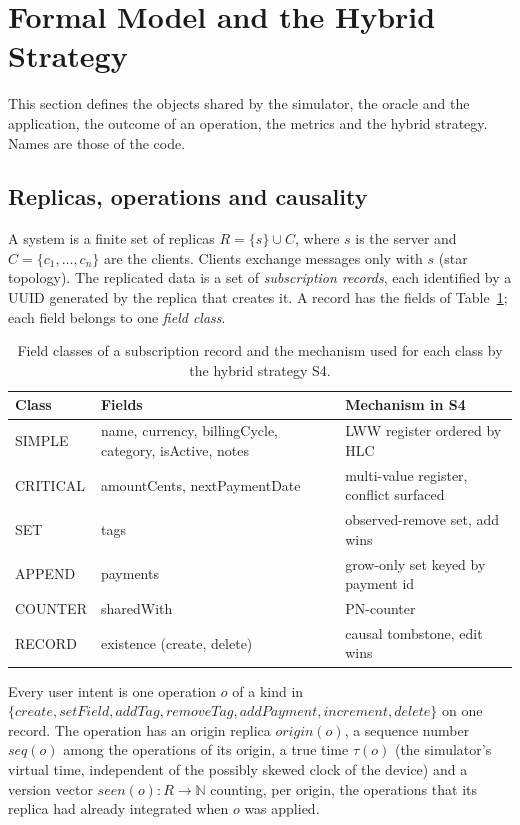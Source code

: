 \section{Formal Model and the Hybrid Strategy}\label{sec:model}

This section defines the objects shared by the simulator, the oracle and the application, the outcome of an
operation, the metrics and the hybrid strategy. Names are those of the code.

\subsection{Replicas, operations and causality}

\begin{definition}[System]\label{def:system}
A system is a finite set of replicas $R = \{s\} \cup C$, where $s$ is the server and $C = \{c_1, \dots, c_n\}$ are
the clients. Clients exchange messages only with $s$ (star topology). The replicated data is a set of
\emph{subscription records}, each identified by a UUID generated by the replica that creates it. A record has the
fields of Table~\ref{tab:classes}; each field belongs to one \emph{field class}.
\end{definition}

\begin{table}[ht]
\caption{Field classes of a subscription record and the mechanism used for each class by the hybrid strategy S4.}
\label{tab:classes}
\footnotesize
\begin{tabular}{@{}l>{\raggedright\arraybackslash}p{}>{\raggedright\arraybackslash}p{}@{}}
\toprule
Class & Fields & Mechanism in S4 \\
\midrule
SIMPLE & name, currency, billingCycle, category, isActive, notes & LWW register ordered by HLC \\
CRITICAL & amountCents, nextPaymentDate & multi-value register, conflict surfaced \\
SET & tags & observed-remove set, add wins \\
APPEND & payments & grow-only set keyed by payment id \\
COUNTER & sharedWith & PN-counter \\
RECORD & existence (create, delete) & causal tombstone, edit wins \\
\bottomrule
\end{tabular}
\end{table}

\begin{definition}[Operation]\label{def:op}
Every user intent is one operation $o$ of a kind in $\{\mathit{create}, \mathit{setField}, \mathit{addTag},
\mathit{removeTag}, \mathit{addPayment}, \mathit{increment}, \mathit{delete}\}$ on one record. The operation has an
origin replica $\mathit{origin}(o)$, a sequence number $\mathit{seq}(o)$ among the operations of its origin, a true
time $\tau(o)$ (the simulator's virtual time, independent of the possibly skewed clock of the device) and a version
vector $\mathit{seen}(o) : R \to \mathbb{N}$ counting, per origin, the operations that its replica had already
integrated when $o$ was applied.
\end{definition}

